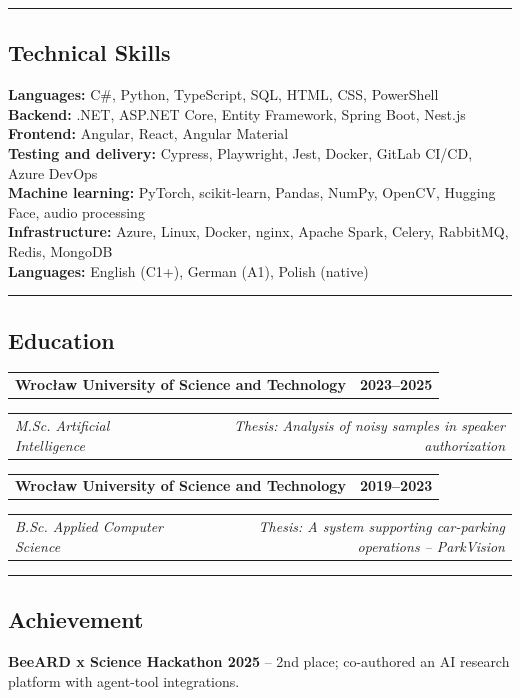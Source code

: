 \documentclass[10pt,a4paper]{extarticle}
\makeatletter
\newcommand{\headerrow}[2]{%
  \begin{tabular*}{\linewidth}{@{}l@{\extracolsep{\fill}}r@{}}
    #1 & #2 \\
  \end{tabular*}%
}
\newcommand{\cvsection}[1]{%
  \vspace{1pt}\hrule\vspace{-1pt}
  \subsection*{\large\color{accent}#1}
  \vspace{-5pt}
}
\newcommand{\entry}[4]{%
  \headerrow{\textbf{#1}}{\textbf{#2}}
  \headerrow{\emph{#3}}{\emph{#4}}

}
\makeatother
\begin{document}
\cvsection{Technical Skills}
\textbf{Languages:} C\#, Python, TypeScript, SQL, HTML, CSS, PowerShell\\
\textbf{Backend:} .NET, ASP.NET Core, Entity Framework, Spring Boot, Nest.js\\
\textbf{Frontend:} Angular, React, Angular Material\\
\textbf{Testing and delivery:} Cypress, Playwright, Jest, Docker, GitLab CI/CD, Azure DevOps\\
\textbf{Machine learning:} PyTorch, scikit-learn, Pandas, NumPy, OpenCV, Hugging Face, audio processing\\
\textbf{Infrastructure:} Azure, Linux, Docker, nginx, Apache Spark, Celery, RabbitMQ, Redis, MongoDB\\
\textbf{Languages:} English (C1+), German (A1), Polish (native)

\cvsection{Education}
\entry{Wrocław University of Science and Technology}{2023--2025}{M.Sc. Artificial Intelligence}{Thesis: Analysis of noisy samples in speaker authorization}
\entry{Wrocław University of Science and Technology}{2019--2023}{B.Sc. Applied Computer Science}{Thesis: A system supporting car-parking operations -- ParkVision}

\cvsection{Achievement}
\textbf{BeeARD x Science Hackathon 2025} -- 2nd place; co-authored an AI research platform with agent-tool integrations.
\end{document}

